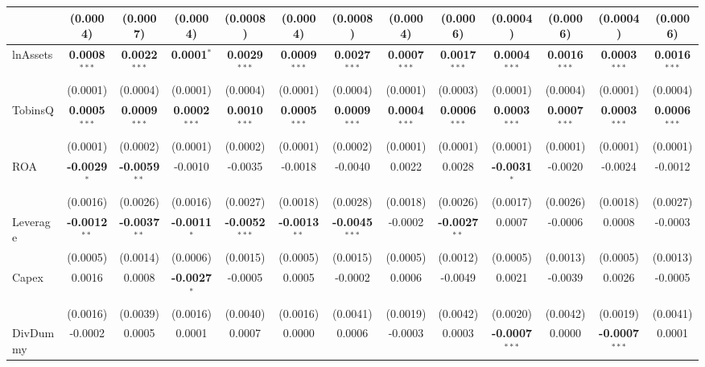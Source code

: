\documentclass[11pt,a4paper]{article}
\begin{document}
\begin{table}[htbp]
\begin{tabular}{lcccccccccccc}
 & (0.0004) & (0.0007) & (0.0004) & (0.0008) & (0.0004) & (0.0008) & (0.0004) & (0.0006) & (0.0004) & (0.0006) & (0.0004) & (0.0006) \\
\midrule
lnAssets & \textbf{0.0008}$^{***}$ & \textbf{0.0022}$^{***}$ & \textbf{0.0001}$^{*}$ & \textbf{0.0029}$^{***}$ & \textbf{0.0009}$^{***}$ & \textbf{0.0027}$^{***}$ & \textbf{0.0007}$^{***}$ & \textbf{0.0017}$^{***}$ & \textbf{0.0004}$^{***}$ & \textbf{0.0016}$^{***}$ & \textbf{0.0003}$^{***}$ & \textbf{0.0016}$^{***}$ \\
 & (0.0001) & (0.0004) & (0.0001) & (0.0004) & (0.0001) & (0.0004) & (0.0001) & (0.0003) & (0.0001) & (0.0004) & (0.0001) & (0.0004) \\
TobinsQ & \textbf{0.0005}$^{***}$ & \textbf{0.0009}$^{***}$ & \textbf{0.0002}$^{***}$ & \textbf{0.0010}$^{***}$ & \textbf{0.0005}$^{***}$ & \textbf{0.0009}$^{***}$ & \textbf{0.0004}$^{***}$ & \textbf{0.0006}$^{***}$ & \textbf{0.0003}$^{***}$ & \textbf{0.0007}$^{***}$ & \textbf{0.0003}$^{***}$ & \textbf{0.0006}$^{***}$ \\
 & (0.0001) & (0.0002) & (0.0001) & (0.0002) & (0.0001) & (0.0002) & (0.0001) & (0.0001) & (0.0001) & (0.0001) & (0.0001) & (0.0001) \\
ROA & \textbf{-0.0029}$^{*}$ & \textbf{-0.0059}$^{**}$ & -0.0010 & -0.0035 & -0.0018 & -0.0040 & 0.0022 & 0.0028 & \textbf{-0.0031}$^{*}$ & -0.0020 & -0.0024 & -0.0012 \\
 & (0.0016) & (0.0026) & (0.0016) & (0.0027) & (0.0018) & (0.0028) & (0.0018) & (0.0026) & (0.0017) & (0.0026) & (0.0018) & (0.0027) \\
Leverage & \textbf{-0.0012}$^{**}$ & \textbf{-0.0037}$^{**}$ & \textbf{-0.0011}$^{*}$ & \textbf{-0.0052}$^{***}$ & \textbf{-0.0013}$^{**}$ & \textbf{-0.0045}$^{***}$ & -0.0002 & \textbf{-0.0027}$^{**}$ & 0.0007 & -0.0006 & 0.0008 & -0.0003 \\
 & (0.0005) & (0.0014) & (0.0006) & (0.0015) & (0.0005) & (0.0015) & (0.0005) & (0.0012) & (0.0005) & (0.0013) & (0.0005) & (0.0013) \\
Capex & 0.0016 & 0.0008 & \textbf{-0.0027}$^{*}$ & -0.0005 & 0.0005 & -0.0002 & 0.0006 & -0.0049 & 0.0021 & -0.0039 & 0.0026 & -0.0005 \\
 & (0.0016) & (0.0039) & (0.0016) & (0.0040) & (0.0016) & (0.0041) & (0.0019) & (0.0042) & (0.0020) & (0.0042) & (0.0019) & (0.0041) \\
DivDummy & -0.0002 & 0.0005 & 0.0001 & 0.0007 & 0.0000 & 0.0006 & -0.0003 & 0.0003 & \textbf{-0.0007}$^{***}$ & 0.0000 & \textbf{-0.0007}$^{***}$ & 0.0001 \\

\end{tabular}
\end{table}
\end{document}

